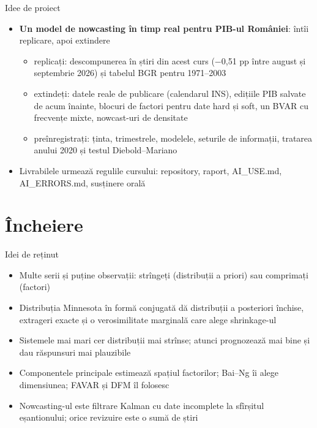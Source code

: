 \begin{frame}{Idee de proiect}
\itemsize{\small}
\begin{itemize}
    \item \textbf{Un model de nowcasting în timp real pentru PIB-ul României}: întîi replicare, apoi extindere
    \begin{itemize}
        \item replicați: descompunerea în știri din acest curs (\ensuremath{-}0{,}51 pp între august și septembrie 2026) și tabelul BGR pentru 1971--2003
        \item extindeți: datele reale de publicare (calendarul INS), edițiile PIB salvate de acum înainte, blocuri de factori pentru date hard și soft, un BVAR cu frecvențe mixte, nowcast-uri de densitate
        \item preînregistrați: ținta, trimestrele, modelele, seturile de informații, tratarea anului 2020 și testul Diebold--Mariano
    \end{itemize}
    \item Livrabilele urmează regulile cursului: repository, raport, AI\_USE.md, AI\_ERRORS.md, susținere orală
\end{itemize}
\end{frame}


\section{Încheiere}

\begin{frame}{Idei de reținut}
\itemsize{\small}
\begin{itemize}
    \item Multe serii și puține observații: strîngeți (distribuții a priori) sau comprimați (factori)
    \item Distribuția Minnesota în formă conjugată dă distribuții a posteriori închise, extrageri exacte și o verosimilitate marginală care alege shrinkage-ul
    \item Sistemele mai mari cer distribuții mai strînse; atunci prognozează mai bine și dau răspunsuri mai plauzibile
    \item Componentele principale estimează spațiul factorilor; Bai--Ng îi alege dimensiunea; FAVAR și DFM îl folosesc
    \item Nowcasting-ul este filtrare Kalman cu date incomplete la sfîrșitul eșantionului; orice revizuire este o sumă de știri
\end{itemize}
\end{frame}


